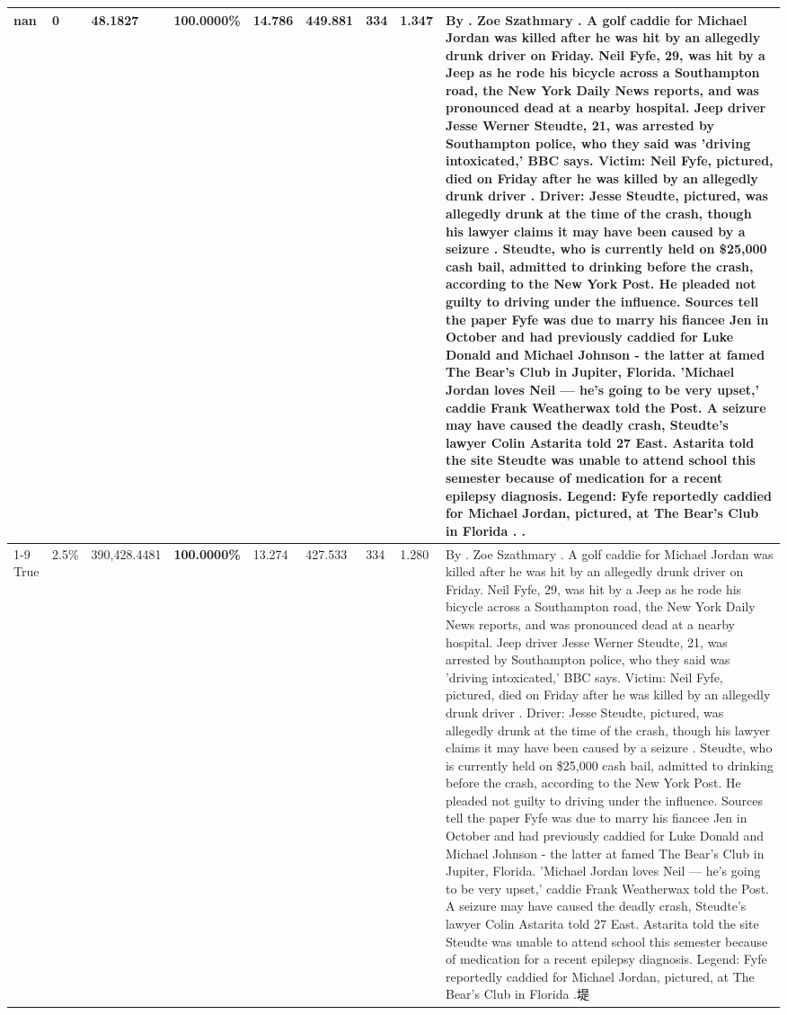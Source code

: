 \begin{table}[H]
\begin{tabular}{lllrlllll}
nan & 0 & \bfseries 48.1827 & \bfseries 100.0000\% & 14.786 & 449.881 & 334 & 1.347 & By . Zoe Szathmary . A golf caddie for Michael Jordan was killed after he was hit by an allegedly drunk driver on Friday. Neil Fyfe, 29, was hit by a Jeep as he rode his bicycle across a Southampton road, the New York Daily News reports, and was pronounced dead at a nearby hospital. Jeep driver Jesse Werner Steudte, 21, was arrested by Southampton police, who they said was 'driving intoxicated,' BBC says. Victim: Neil Fyfe, pictured, died on Friday after he was killed by an allegedly drunk driver . Driver: Jesse Steudte, pictured, was allegedly drunk at the time of the crash, though his lawyer claims it may have been caused by a seizure . Steudte, who is currently held on \$25,000 cash bail, admitted to drinking before the crash, according to the New York Post. He pleaded not guilty to driving under the influence. Sources tell the paper Fyfe was due to marry his fiancee Jen in October and had previously caddied for Luke Donald and Michael Johnson - the latter at famed The Bear's Club in Jupiter, Florida. 'Michael Jordan loves Neil — he’s going to be very upset,' caddie Frank Weatherwax told the Post. A seizure may have caused the deadly crash, Steudte's lawyer Colin Astarita told 27 East. Astarita told the site Steudte was unable to attend school this semester because of medication for a recent epilepsy diagnosis. Legend: Fyfe reportedly caddied for Michael Jordan, pictured, at The Bear's Club in Florida . . \\
\cline{1-9}
True & 2.5\% & 390,428.4481 & \bfseries \color{red} 100.0000\% & 13.274 & 427.533 & 334 & 1.280 & By . Zoe Szathmary . A golf caddie for Michael Jordan was killed after he was hit by an allegedly drunk driver on Friday. Neil Fyfe, 29, was hit by a Jeep as he rode his bicycle across a Southampton road, the New York Daily News reports, and was pronounced dead at a nearby hospital. Jeep driver Jesse Werner Steudte, 21, was arrested by Southampton police, who they said was 'driving intoxicated,' BBC says. Victim: Neil Fyfe, pictured, died on Friday after he was killed by an allegedly drunk driver . Driver: Jesse Steudte, pictured, was allegedly drunk at the time of the crash, though his lawyer claims it may have been caused by a seizure . Steudte, who is currently held on \$25,000 cash bail, admitted to drinking before the crash, according to the New York Post. He pleaded not guilty to driving under the influence. Sources tell the paper Fyfe was due to marry his fiancee Jen in October and had previously caddied for Luke Donald and Michael Johnson - the latter at famed The Bear's Club in Jupiter, Florida. 'Michael Jordan loves Neil — he’s going to be very upset,' caddie Frank Weatherwax told the Post. A seizure may have caused the deadly crash, Steudte's lawyer Colin Astarita told 27 East. Astarita told the site Steudte was unable to attend school this semester because of medication for a recent epilepsy diagnosis. Legend: Fyfe reportedly caddied for Michael Jordan, pictured, at The Bear's Club in Florida .堤 \\

\end{tabular}
\end{table}
